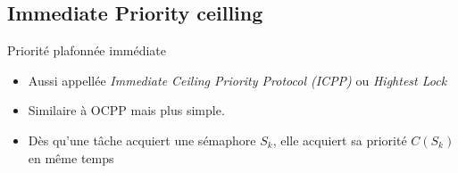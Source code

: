 \subsection{Immediate Priority ceilling}

\begin{frame}{Priorité plafonnée immédiate}
  \begin{itemize} 
  \item  Aussi  appellée  \emph{Immediate  Ceiling  Priority  Protocol
      (ICPP)} ou \emph{Hightest Lock}
  \item Similaire à OCPP mais plus simple.
  \item Dès  qu'une tâche acquiert une sémaphore  $S_k$, elle acquiert
    sa priorité $C(S_k)$ en même temps
  \end{itemize} 
\end{frame} 

